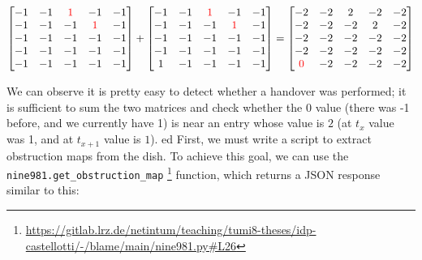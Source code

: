 \documentclass[IN,11pt,twoside,openright,idp,english]{tumthesis}
\begin{document}
$\begin{bmatrix}
-1 & -1 & \color{red}1 &           -1 & -1 \\
-1 & -1 &           -1 & \color{red}1 & -1 \\
-1 & -1 &           -1 &           -1 & -1 \\
-1 & -1 &           -1 &           -1 & -1 \\
-1 & -1 &           -1 &           -1 & -1 \\
\end{bmatrix}
+
\begin{bmatrix}
-1 & -1 & \color{red}1 &           -1 & -1 \\
-1 & -1 &           -1 & \color{red}1 & -1 \\
-1 & -1 &           -1 &           -1 & -1 \\
-1 & -1 &           -1 &           -1 & -1 \\
1 & -1 &            -1 &           -1 & -1 \\
\end{bmatrix}
=
\begin{bmatrix}
          -2 & -2 & 2 & -2 & -2 \\
          -2 & -2 & -2 & 2 & -2 \\
          -2 & -2 & -2 & -2 & -2 \\
          -2 & -2 & -2 & -2 & -2 \\
\color{red}0 & -2 & -2 & -2 & -2 \\
\end{bmatrix}$

\vspace{10mm}

We can observe it is pretty easy to detect whether a handover was performed; it is sufficient to sum the two matrices and check whether the $ 0 $ value (there was -1 before, and we currently have 1) is near an entry whose value is $ 2 $ (at $ t_{x} $ value was 1, and at $ t_{x+1} $ value is $ 1 $). 
ed
First, we must write a script to extract obstruction maps from the dish. To achieve this goal, we can use the \texttt{nine981.get\_obstruction\_map} \footnote{\url{https://gitlab.lrz.de/netintum/teaching/tumi8-theses/idp-castellotti/-/blame/main/nine981.py\#L26}} function, which returns a JSON response similar to this:
\end{document}
